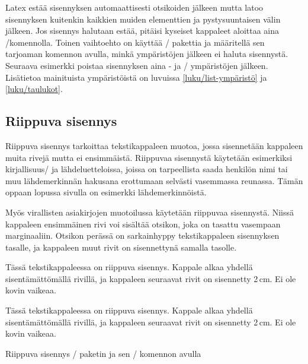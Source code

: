 Latex estää sisennyksen automaattisesti otsikoiden jälkeen mutta latoo
sisennyksen kuitenkin kaikkien muiden elementtien ja pystysuuntaisen
välin jälkeen. Jos sisennys halutaan estää, pitäisi kyseiset kappaleet
aloittaa aina \-/komennolla. Toinen vaihtoehto on
käyttää \-/ pakettia ja
määritellä sen tarjoaman komennon avulla, minkä ympäristöjen jälkeen ei
haluta sisennystä. Seuraava esimerkki poistaa sisennyksen aina
- ja \-/ ympäristöjen jälkeen.
Lisätietoa mainituista ympäristöistä on luvuissa
\ref{luku/list-ympäristö} ja \ref{luku/taulukot}.

\begin{koodilohkosis}
\end{koodilohkosis}

\subsection{Riippuva sisennys}
\label{luku/riippuva-sisennys}

Riippuva sisennys tarkoittaa tekstikappaleen muotoa, jossa sisennetään
kappaleen muita rivejä mutta ei ensimmäistä. Riippuvaa sisennystä
käytetään esimerkiksi kirjallisuus\-/{} ja lähdeluetteloissa, joissa on
tarpeellista saada henkilön nimi tai muu lähdemerkinnän hakusana
erottumaan selvästi vasemmassa reunassa. Tämän oppaan lopussa sivulla
\pageref{luku/kirjallisuutta} on esimerkki lähdemerkinnöistä.

Myös virallisten asiakirjojen muotoilussa käytetään riippuvaa
sisennystä. Niissä kappaleen ensimmäinen rivi voi sisältää otsikon, joka
on tasattu vasempaan marginaaliin. Otsikon perässä on sarkainhyppy
tekstikappaleen sisennyksen tasalle, ja kappaleen muut rivit on
sisennettynä samalla tasolle.

\begin{esimerkki*}
  \komentoi{,}

\begin{koodilohko}
Tässä tekstikappaleessa on riippuva sisennys. Kappale
alkaa yhdellä sisentämättömällä rivillä, ja kappaleen seuraavat rivit
on sisennetty 2\,cm. Ei ole kovin vaikeaa.
\end{koodilohko}
  \begin{tulos}
    Tässä tekstikappaleessa on riippuva sisennys. Kappale
    alkaa yhdellä sisentämättömällä rivillä, ja kappaleen seuraavat rivit
    on sisennetty 2\,cm. Ei ole kovin vaikeaa.
  \end{tulos}
  \caption{Riippuva sisennys \-/ paketin ja sen
    \-/ komennon avulla}
  \label{esim/riippuva-sis-hangpara}
\end{esimerkki*}


